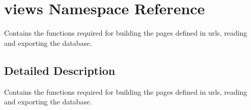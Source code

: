 \hypertarget{namespaceviews}{\section{views Namespace Reference}
\label{namespaceviews}
}


Contains the functions required for building the pages defined in urls, reading and exporting the database.  




\subsection{Detailed Description}
Contains the functions required for building the pages defined in urls, reading and exporting the database. 